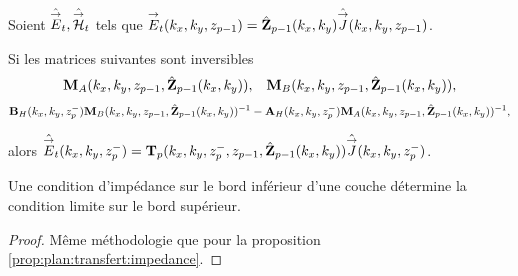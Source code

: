     \begin{prop}%
      \label{prop:plan:relevement:impedance}

      Soient \(\hat{{\overset{\rightarrow}{E}}}_t,\hat{{\overset{\rightarrow}{\mathcal{H}}}}_t\) tels que \({\overset{\rightarrow}{E}}_t(k_x,k_y,z_{p-1}) = \hat{\mathbf{Z}}_{p-1}(k_x,k_y)\hat{{\overset{\rightarrow}{J}}}(k_x,k_y,z_{p-1})\).

      Si les matrices suivantes sont inversibles
      \begin{align*}
        \mathbf{M}_{A}(k_x,k_y,z_{p-1},\hat{\mathbf{Z}}_{p-1}(k_x,k_y)), && \mathbf{M}_{B}(k_x,k_y,z_{p-1},\hat{\mathbf{Z}}_{p-1}(k_x,k_y)),
      \end{align*}
      \begin{align*}
        \mathbf{B}_{H}(k_x,k_y,z_p^-)\mathbf{M}_{B}(k_x,k_y,z_{p-1},\hat{\mathbf{Z}}_{p-1}(k_x,k_y))^{-1} - \mathbf{A}_{H}(k_x,k_y,z_p^-)\mathbf{M}_{A}(k_x,k_y,z_{p-1},\hat{\mathbf{Z}}_{p-1}(k_x,k_y))^{-1},
      \end{align*}

      alors \(\hat{{\overset{\rightarrow}{E}}}_t(k_x,k_y,z_p^-) = \mathbf{T}_p(k_x,k_y,z_p^-,z_{p-1},\hat{\mathbf{Z}}_{p-1}(k_x,k_y))\hat{{\overset{\rightarrow}{J}}}(k_x,k_y,z_p^-)\).

      Une condition d'impédance sur le bord inférieur d'une couche détermine la condition limite sur le bord supérieur.
    \end{prop}

      



    \begin{proof}
      Même méthodologie que pour la proposition \ref{prop:plan:transfert:impedance}.
    \end{proof}


